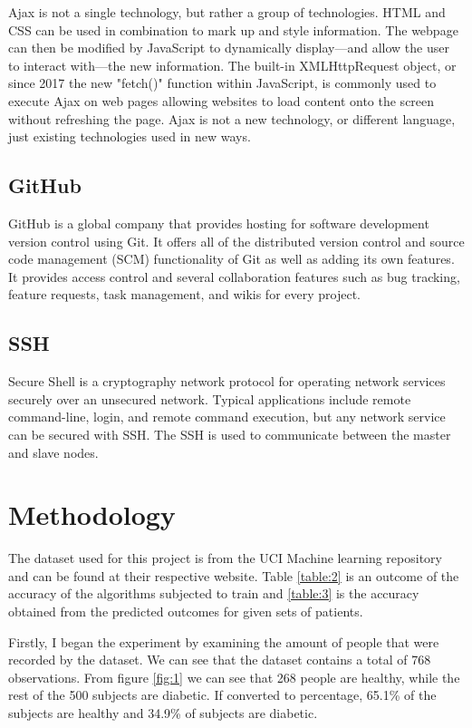 \documentclass[12pt]{article}
\begin{document}
Ajax is not a single technology, but rather a group of technologies. HTML and CSS can be used in combination to mark up and style information. The webpage can then be modified by JavaScript to dynamically display—and allow the user to interact with—the new information. The built-in XMLHttpRequest object, or since 2017 the new "fetch()" function within JavaScript, is commonly used to execute Ajax on web pages allowing websites to load content onto the screen without refreshing the page. Ajax is not a new technology, or different language, just existing technologies used in new ways.

\subsection{GitHub}
GitHub is a global company that provides hosting for software development version control using Git. It offers all of the distributed version control and source code management (SCM) functionality of Git as well as adding its own features. It provides access control and several collaboration features such as bug tracking, feature requests, task management, and wikis for every project.

\subsection{SSH}
Secure Shell is a cryptography network protocol for operating network services securely over an unsecured network. Typical applications include remote command-line, login, and remote command execution, but any network service can be secured with SSH. The SSH is used to communicate between the master and slave nodes.

\newpage
\section{Methodology}
The dataset used for this project is from the UCI Machine learning repository and can be found at their respective website. Table \ref{table:2} is an outcome of the accuracy of the algorithms subjected to train and \ref{table:3} is the accuracy obtained from the predicted outcomes for given sets of patients.

Firstly, I began the experiment by examining the amount of people that were recorded by the dataset. We can see that the dataset contains a total of 768 observations. From figure \ref{fig:1} we can see that 268 people are healthy, while the rest of the 500 subjects are diabetic. If converted to percentage, 65.1\% of the subjects are healthy and 34.9\% of subjects are diabetic.
\end{document}
